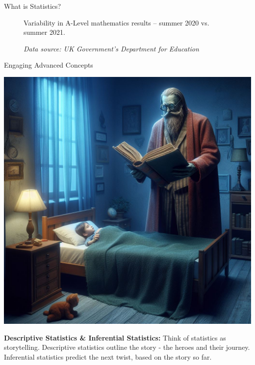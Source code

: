 \documentclass[final]{beamer}
\begin{document}
\begin{frame}[t]{}
\begin{columns}[t]
\begin{column}{.3\textwidth}
\begin{block}{What is Statistics?}
\begin{figure}

					\caption{Variability in A-Level mathematics results – summer 2020 vs. summer 2021.}
					\caption*{\textit{\centering\scriptsize Data source: UK Government's Department for Education}}

				\end{figure}

				\vspace{0.5cm}
				
			\end{block}

			\vspace{0.5cm}

			\begin{block}{Engaging Advanced Concepts}

				\vspace{2cm}

				\begin{minipage}{0.3\textwidth}
					\centering
					\includegraphics[width=\linewidth]{./images/1-2-1-StoryTelling.jpeg}
				\end{minipage}
				\hfill
				\begin{minipage}{0.68\textwidth}
					\textbf{Descriptive Statistics \& Inferential Statistics:} Think of statistics as storytelling. Descriptive statistics outline the story - the heroes and their journey. Inferential statistics predict the next twist, based on the story so far.
				\end{minipage}


\end{block}
\end{column}
\end{columns}
\end{frame}
\end{document}
